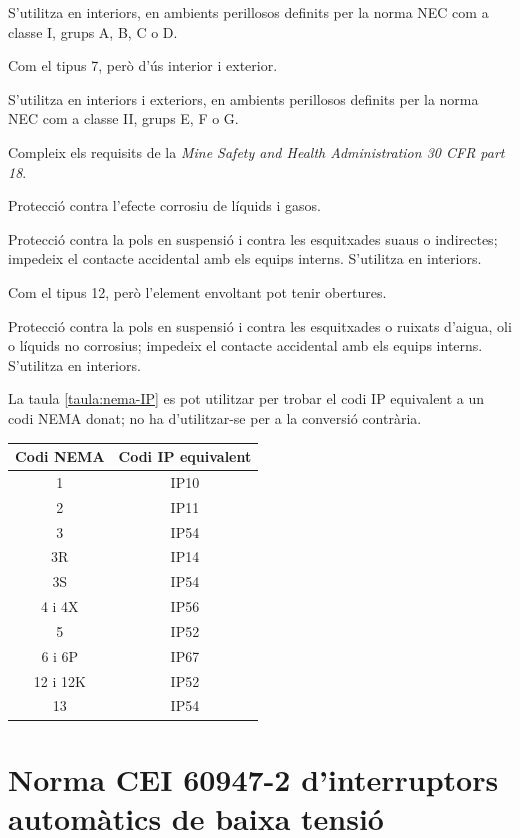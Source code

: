 \begin{list}{}
	\item[7] S'utilitza en interiors, en ambients perillosos definits per la norma NEC com a classe I, grups A, B, C o D.
	\item[8] Com el tipus 7, però d'ús interior i exterior.
	\item[9] S'utilitza en interiors i exteriors, en ambients perillosos definits per la norma NEC com a classe II, grups E, F o G.
	\item[10] Compleix els requisits de la \textit{Mine Safety and Health Administration 30 CFR part 18}.
	\item[11] Protecció contra l'efecte corrosiu de líquids i gasos.
	\item[12] Protecció contra la pols en suspensió i contra les esquitxades suaus o indirectes; impedeix el contacte accidental amb els equips interns. S'utilitza en interiors.
	\item[12K] Com el tipus 12, però l'element envoltant pot tenir obertures.
	\item[13] Protecció contra la pols en suspensió i contra les esquitxades o ruixats d'aigua, oli o líquids no corrosius; impedeix el contacte accidental amb els equips interns. S'utilitza en interiors.
\end{list}



La taula \vref{taula:nema-IP} es pot utilitzar per trobar el codi IP equivalent a un codi NEMA donat; no ha d'utilitzar-se per a la conversió contrària.

\begin{center}
	\label{taula:nema-IP}
	\begin{tabular}{cc}
		\toprule[1pt]
		Codi NEMA & Codi IP equivalent \\
		\midrule
		1 & IP10 \\
		2 & IP11 \\
		3 & IP54 \\
		3R & IP14 \\
		3S & IP54 \\
		4 i 4X & IP56 \\
		5 & IP52 \\
		6 i 6P & IP67\\
		12 i 12K & IP52 \\
		13 & IP54 \\
		\bottomrule[1pt]
	\end{tabular}
\end{center}


\section{Norma CEI 60947-2  d'interruptors automàtics  de baixa tensió}


